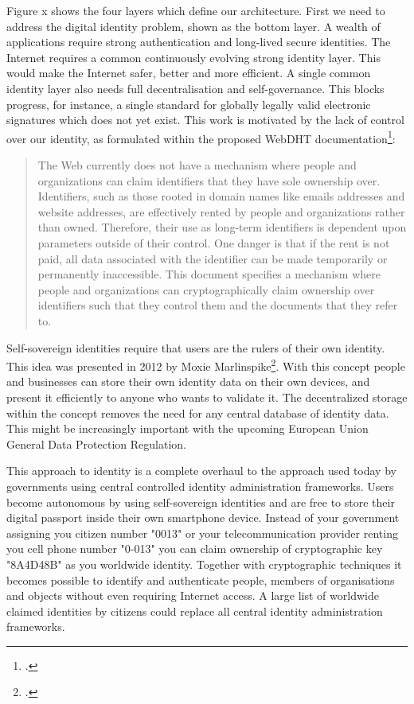 \documentclass[USenglish]{article}
\begin{document}
Figure x shows the four layers which define our architecture.
First we need to address the digital identity problem, shown as the bottom layer.
A wealth of applications require strong authentication and long-lived secure identities.
The Internet requires a common continuously evolving strong identity layer.
This would make the Internet safer, better and more efficient.
A single common identity layer also needs full decentralisation and self-governance.
This blocks progress, for instance, a single standard for globally legally valid electronic signatures which does not yet exist.
This work is motivated by the lack of control over our identity, as formulated within the proposed WebDHT documentation\footcite{webdhtproposal}: 

\blockquote{The Web currently does not have a mechanism where people and organizations can claim identifiers that they have sole ownership over. Identifiers, such as those rooted in domain names like emails addresses and website addresses, are effectively rented by people and organizations rather than owned. Therefore, their use as long-term identifiers is dependent upon parameters outside of their control. One danger is that if the rent is not paid, all data associated with the identifier can be made temporarily or permanently inaccessible. This document specifies a mechanism where people and organizations can cryptographically claim ownership over identifiers such that they control them and the documents that they refer to.}

Self-sovereign identities require that users are the rulers of their own identity.
This idea was presented in 2012 by Moxie Marlinspike\footcite{sovereignsource}.
With this concept people and businesses can store their own identity data on their own devices, and present it efficiently to anyone who wants to validate it.
The decentralized storage within the concept removes the need for any central database of identity data.
This might be increasingly important with the upcoming European Union General Data Protection Regulation.

This approach to identity is a complete overhaul to the approach used today by governments using central controlled identity administration frameworks.
Users become autonomous by using self-sovereign identities and are free to store their digital passport inside their own smartphone device.
Instead of your government assigning you citizen number "0013" or your telecommunication provider renting you cell phone number "0-013" you can claim ownership of cryptographic key "8A4D48B" as you worldwide identity.
Together with cryptographic techniques it becomes possible to identify and authenticate people, members of organisations and objects without even requiring Internet access.
A large list of worldwide claimed identities by citizens could replace all central identity administration frameworks.
\end{document}
